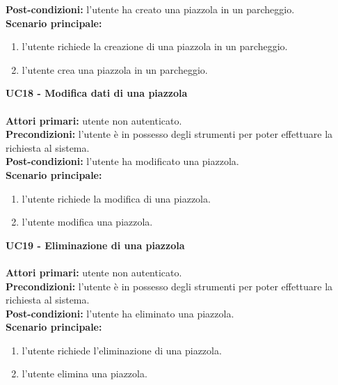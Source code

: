 \textbf{Post-condizioni:} l'utente ha creato una piazzola in un parcheggio.
\\
\textbf{Scenario principale:}
\begin{enumerate}
    \item l'utente richiede la creazione di una piazzola in un parcheggio.
    \item l'utente crea una piazzola in un parcheggio.
\end{enumerate}
\leavevmode\newline
\textbf{UC18 - Modifica dati di una piazzola}
\\\\
\textbf{Attori primari:} utente non autenticato.
\\
\textbf{Precondizioni:} l'utente è in possesso degli strumenti per poter effettuare la richiesta al sistema.
\\
\textbf{Post-condizioni:} l'utente ha modificato una piazzola.
\\
\textbf{Scenario principale:}
\begin{enumerate}
    \item l'utente richiede la modifica di una piazzola.
    \item l'utente modifica una piazzola.
\end{enumerate}
\clearpage
\leavevmode\newline
\textbf{UC19 - Eliminazione di una piazzola}
\\\\
\textbf{Attori primari:} utente non autenticato.
\\
\textbf{Precondizioni:} l'utente è in possesso degli strumenti per poter effettuare la richiesta al sistema.
\\
\textbf{Post-condizioni:} l'utente ha eliminato una piazzola.
\\
\textbf{Scenario principale:}
\begin{enumerate}
    \item l'utente richiede l'eliminazione di una piazzola.
    \item l'utente elimina una piazzola.
\end{enumerate}

